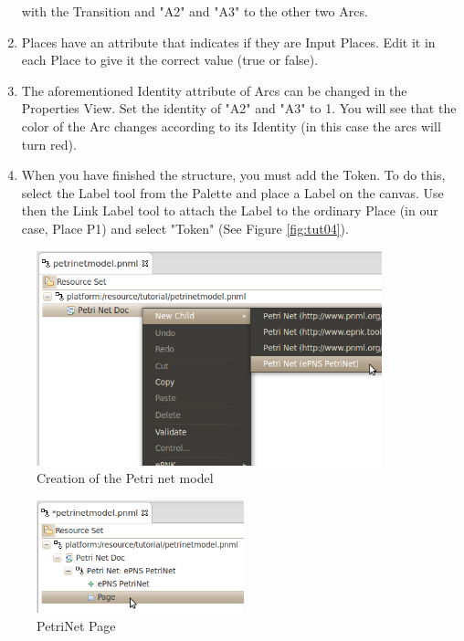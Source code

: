 \begin{enumerate}
  with the Transition and "A2" and "A3" to the other two Arcs.
  \item Places have an attribute that indicates if they are Input Places. Edit it in each Place to give it the correct 
  value (true or false).  
  \item The aforementioned Identity attribute of Arcs can be changed in the Properties View. Set the identity of "A2" and "A3" to 1. You will 
  see that the color of the Arc changes according to its Identity (in this case the arcs will turn red).
  \item When you have finished the structure, you must add the Token. To do this, select the Label tool from the Palette and 
  place a Label on the canvas. Use then the Link Label tool to attach the Label to the ordinary Place (in our case, Place P1) 
  and select "Token" (See Figure \ref{fig:tut04}).
\end{enumerate}

\begin{figure}[htp]
\begin{center}
  \includegraphics[width=10.0cm]{image/tutorial/Tutorial_01.png}
  \caption{Creation of the Petri net model}
  \label{fig:tut01}
\end{center}
\end{figure}

\begin{figure}[htp]
\begin{center}
  \includegraphics[width=6.0cm]{image/tutorial/Tutorial_02.png}
  \caption{PetriNet Page}
  \label{fig:tut02}
\end{center}
\end{figure}

